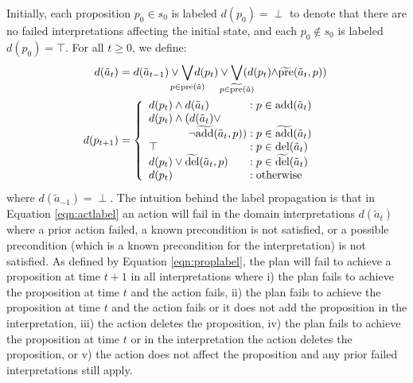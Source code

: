 \documentclass[letterpaper]{article}
\begin{document}
Initially, each proposition $p_0 \in s_0$ is labeled $d(p_0) = \perp$ to denote that there are no failed interpretations affecting the initial state, and each $p_0 \not\in s_0$ is labeled $d(p_0)=\top$.  For all $t \geq 0$, we define: 
 \begin{align}
\label{eqn:actlabel}d(\tilde{a}_t) &=  
d(\tilde{a}_{t-1}) \vee \hspace*{-.35cm}\bigvee\limits_{p \in \text{pre}(\tilde{a})}\hspace*{-.39cm} d(p_t) \vee\hspace*{-.35cm} \bigvee\limits_{p \in \widetilde{\text{pre}}(\tilde{a})} \hspace*{-.35cm}(d(p_t)\hspace*{-.09cm}\wedge\hspace*{-.09cm} \widetilde{\text{pre}}(\tilde{a}_t, p)  ) %
\\
\label{eqn:proplabel}\hspace*{-.1cm}d(p_{t+1}) &= \left\{
\begin{array}{l@{\;}l@{\;}r}
d(p_t) \wedge d(\tilde{a}_t) & : p \in \text{add}(\tilde{a}_t) \\
d(p_t) \wedge  (d(\tilde{a}_t) \vee \\
\hspace*{1.25cm} \neg\widetilde{\text{add}}(\tilde{a}_t, p)) & : p \in \widetilde{\text{add}}(\tilde{a}_t)\\
\top & : p \in \text{del}(\tilde{a}_t)\\
d(p_t) \vee  \widetilde{\text{del}}(\tilde{a}_t, p) %
 &: p \in \widetilde{\text{del}}(\tilde{a}_t)\\
d(p_t) & : \text{otherwise} 
\end{array}
\right. 
\end{align}
\noindent where $d(\tilde{a}_{-1}) = \perp$. The intuition behind the label propagation is that in Equation \ref{eqn:actlabel} an action will fail  in the domain interpretations $d(\tilde{a}_t)$ where a prior action failed, a known precondition is not satisfied, or a possible precondition (which is a known precondition for the interpretation) is not satisfied. As defined by Equation \ref{eqn:proplabel}, the plan will fail to achieve a proposition at time $t+1$ in all interpretations where i) the plan fails to achieve the proposition at time $t$ and the action fails, ii) the plan fails to achieve the proposition at time $t$ and the action fails or it does not add the proposition in the interpretation, iii) the action deletes the proposition, iv) the plan fails to achieve the proposition at time $t$ or in the interpretation the action deletes the proposition, or v) the action does not affect the proposition and any prior failed interpretations still apply.
\end{document}

